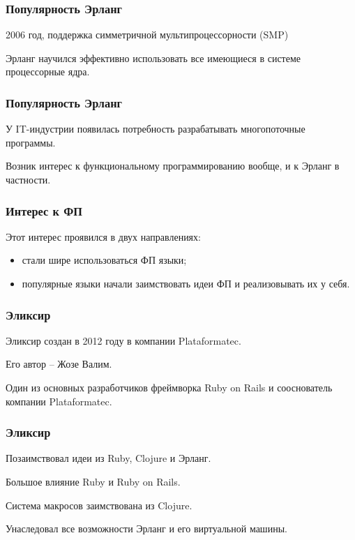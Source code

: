 \documentclass[10pt]{beamer}
\begin{document}
\begin{frame}
  \frametitle{Популярность Эрланг}
  2006 год, поддержка симметричной мультипроцессорности (SMP)
  \par \bigskip
  Эрланг научился эффективно использовать
  все имеющиеся в системе процессорные ядра.
\end{frame}

\begin{frame}
  \frametitle{Популярность Эрланг}
  У IT-индустрии появилась потребность
  разрабатывать многопоточные программы.
  \par \bigskip
  Возник интерес к функциональному программированию вообще,
  и к Эрланг в частности.
\end{frame}

\begin{frame}
  \frametitle{Интерес к ФП}
  Этот интерес проявился в двух направлениях:
  \begin{itemize}
  \item стали шире использоваться ФП языки;
  \item популярные языки начали заимствовать идеи ФП и реализовывать их у себя.
  \end{itemize}
\end{frame}

\begin{frame}
  \frametitle{Эликсир}
  Эликсир создан в 2012 году в компании Plataformatec.
  \par \bigskip
  Его автор -- Жозе Валим.
  \par \bigskip
  Один из основных разработчиков фреймворка Ruby on Rails
  и сооснователь компании Plataformatec.
\end{frame}

\begin{frame}
  \frametitle{Эликсир}
  Позаимствовал идеи из Ruby, Clojure и Эрланг.
  \par \bigskip
  Большое влияние Ruby и Ruby on Rails.
  \par \bigskip
  Система макросов заимствована из Clojure.
  \par \bigskip
  Унаследовал все возможности Эрланг и его виртуальной машины.
\end{frame}
\end{document}
